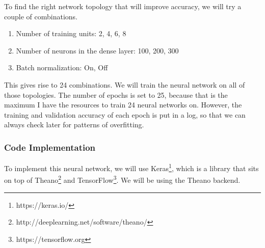 \documentclass{article}
\begin{document}
To find the right network topology that will improve accuracy, we will try a couple of combinations.

\begin{enumerate}
\item{Number of training units: 2, 4, 6, 8}
\item{Number of neurons in the dense layer: 100, 200, 300}
\item{Batch normalization: On, Off}
\end{enumerate}

This gives rise to 24 combinations. We will train the neural network on all of those topologies. The number of epochs is set to 25, because that is the maximum I have the resources to train 24 neural networks on. However, the training and validation accuracy of each epoch is put in a log, so that we can always check later for patterns of overfitting.

\subsubsection{Code Implementation}

To implement this neural network, we will use Keras\footnote{https://keras.io/}, which is a library that sits on top of Theano\footnote{http://deeplearning.net/software/theano/} and TensorFlow\footnote{https://tensorflow.org}. We will be using the Theano backend.
\end{document}

